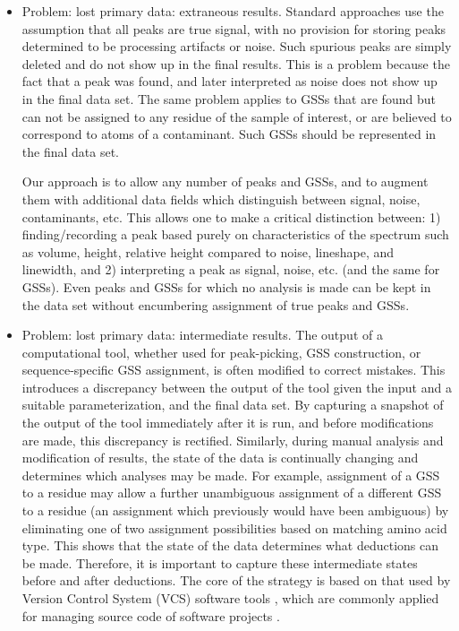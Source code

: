 \begin{itemize}
  \item Problem: lost primary data:  extraneous results.  Standard approaches use the 
assumption that all peaks are true signal, with no provision for storing peaks 
determined to be processing artifacts or noise.  Such spurious peaks are simply 
deleted and do not show up in the final results.  This is a problem because the 
fact that a peak was found, and later interpreted as noise does not show up in 
the final data set.  The same problem applies to GSSs that are found 
but can not be assigned to any residue of the sample of interest, or are 
believed to correspond to atoms of a contaminant.  Such GSSs should 
be represented in the final data set.

Our approach is to allow any number of peaks and GSSs, and to 
augment them with additional data fields which distinguish between signal, 
noise, contaminants, etc.  This allows one to make a critical distinction 
between: 1) finding/recording a peak based purely on characteristics of 
the spectrum such as volume, height, relative height compared to noise, 
lineshape, and linewidth, and 2) interpreting a peak as signal, noise, 
etc. (and the same for GSSs).  Even peaks and GSSs for 
which no analysis is made can be kept in the data set without encumbering 
assignment of true peaks and GSSs.

  \item Problem: lost primary data: intermediate results.  The output of a 
computational tool, whether used for peak-picking, GSS construction, 
or sequence-specific GSS assignment, is often modified to correct 
mistakes.  This introduces a discrepancy between the output of the tool 
given the input and a suitable parameterization, and the final data set.  
By capturing a snapshot of the output of the tool immediately after it is 
run, and before modifications are made, this discrepancy is rectified.
Similarly, during manual analysis and modification of results, the state of 
the data is continually changing and determines which analyses may be made.  
For example, assignment of a GSS to a residue may allow a further 
unambiguous assignment of a different GSS to a residue (an assignment 
which previously would have been ambiguous) by eliminating one of two 
assignment possibilities based on matching amino acid type.  This shows that 
the state of the data determines what deductions can be made.  Therefore, it 
is important to capture these intermediate states before and after deductions.
The core of the strategy is based on that used by Version Control System (VCS) 
software tools \cite{vcs_concepts, hinsen2009vcs}, which are commonly 
applied for managing source code of 
software projects \cite{loeliger2012git, cvs, svn}.  


\end{itemize}
